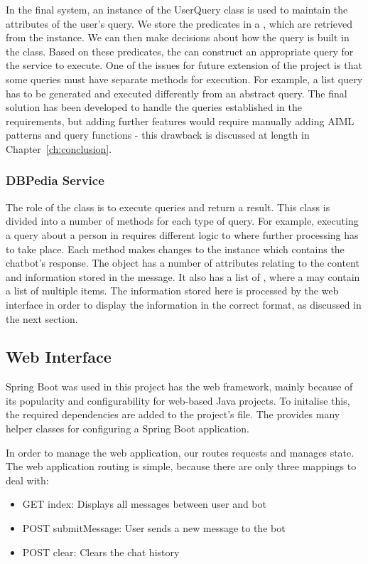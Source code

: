 In the final system, an instance of the UserQuery class is used to maintain the attributes of the user's query. We store the predicates in a , which are retrieved from the  instance. We can then make decisions about how the query is built in the  class. Based on these predicates, the  can construct an appropriate query for the  service to execute. One of the issues for future extension of the project is that some queries must have separate methods for execution. For example, a list query has to be generated and executed differently from an abstract query. The final solution has been developed to handle the queries established in the requirements, but adding further features would require manually adding AIML patterns and query functions - this drawback is discussed at length in Chapter~\ref{ch:conclusion}.

\subsubsection{DBPedia Service}
The role of the  class is to execute queries and return a result. This class is divided into a number of methods for each type of query. For example, executing a query about a person in  requires different logic to  where further processing has to take place. Each method makes changes to the  instance which contains the chatbot's response. The  object has a number of attributes relating to the content and information stored in the message. It also has a list of , where a  may contain a list of multiple items. The information stored here is processed by the web interface in order to display the information in the correct format, as discussed in the next section.

\subsection{Web Interface}
Spring Boot \cite{springmanual} was used in this project has the web framework, mainly because of its popularity and configurability for web-based Java projects. To initalise this, the required dependencies are added to the project's  file. The  provides many helper classes for configuring a Spring Boot application.

In order to manage the web application, our  routes requests and manages state. The web application routing is simple, because there are only three mappings to deal with:
\begin{itemize}
	\item GET index: Displays all messages between user and bot
	\item POST submitMessage: User sends a new message to the bot
	\item POST clear: Clears the chat history
\end{itemize}

